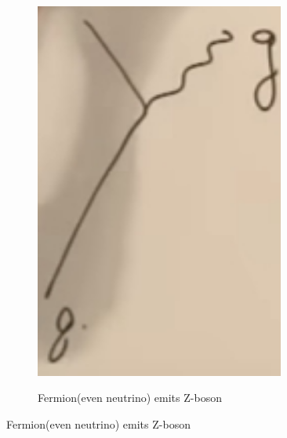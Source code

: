 \documentclass[]{article}
\begin{document}
\begin{appendices}
\begin{figure}[H]
\begin{subfigure}[t]{0.3\textwidth}
			\includegraphics[width=0.9\textwidth]{2-a2-feynman2}
		\end{subfigure}
		\begin{subfigure}[t]{0.3\textwidth}
			\caption{Fermion(even neutrino) emits Z-boson}

\end{subfigure}
\end{figure}
\end{appendices}
\end{document}
